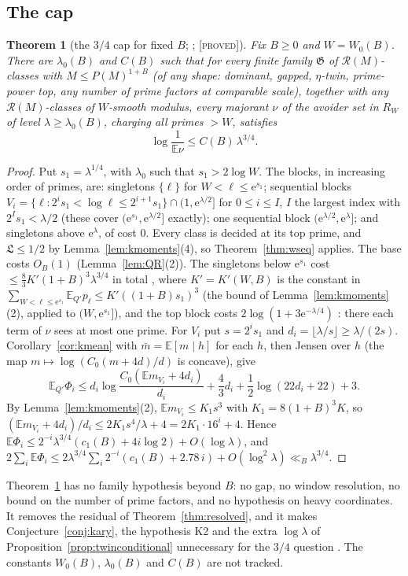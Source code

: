 \documentclass[10pt,reqno]{amsart}
\newtheorem{theorem}{Theorem}[section]
\theoremstyle{definition}
\theoremstyle{remark}
\newcommand{\cR}{\mathscr R}
\newcommand{\cG}{\mathfrak G}
\newcommand{\E}{\mathbb E}
\newcommand{\e}{\mathrm e}
\newcommand{\lab}[1]{\textup{[\textsc{#1}]}}
\begin{document}
\subsection{The cap}
\begin{theorem}[the $3/4$ cap for fixed $B$; {\cite[Thm~4.5]{KA}}; \lab{proved}]\label{thm:karycap}
Fix $B\geq0$ and $W=W_0(B)$.  There are $\lambda_0(B)$ and $C(B)$ such that
for every finite family $\cG$ of $\cR(M)$-classes with $M\leq P(M)^{1+B}$ (of any
shape: dominant, gapped, $\eta$-twin, prime-power top, any number of prime
factors at comparable scale), together with any $\cR(M)$-classes of
$W$-smooth modulus, every majorant $\nu$ of the avoider set in $R_W$ of
level $\lambda\geq\lambda_0(B)$, charging all primes $>W$, satisfies
\[
 \log\frac1{\E\nu}\leq C(B)\,\lambda^{3/4}.
\]
\end{theorem}
\begin{proof}
Put $s_1=\lambda^{1/4}$, with $\lambda_0$ such that $s_1>2\log W$.  The blocks,
in increasing order of primes, are: singletons $\{\ell\}$ for
$W<\ell\leq\e^{s_1}$; sequential blocks
$V_i=\{\ell:2^is_1<\log\ell\leq2^{i+1}s_1\}\cap(1,\e^{\lambda/2}]$ for
$0\leq i\leq I$, $I$ the largest index with $2^Is_1<\lambda/2$ (these cover
$(\e^{s_1},\e^{\lambda/2}]$ exactly); one sequential block
$(\e^{\lambda/2},\e^\lambda]$; and singletons above $\e^\lambda$, of cost $0$.
Every class is decided at its top prime, and $\mathfrak L\leq1/2$ by
Lemma~\ref{lem:kmoments}(4), so Theorem~\ref{thm:wseq} applies.  The base
costs $O_B(1)$ (Lemma~\ref{lem:QR}(2)).  The singletons below
$\e^{s_1}$ cost $\leq\frac83K'(1+B)^3\lambda^{3/4}$ in total
\cite[Prop.~4.1]{TW}, where $K'=K'(W,B)$ is the constant in
$\sum_{W<\ell\leq\e^{s_1}}\E_{Q'}p_\ell\leq K'((1+B)s_1)^3$ (the bound of
Lemma~\ref{lem:kmoments}(2), applied to $(W,\e^{s_1}]$), and the top block costs $2\log(1+3\e^{-\lambda/4})$
\cite[Lemma~4.2, Cor.~4.3]{TW}: there each term of $\nu$ sees at most one
prime.  For $V_i$ put $s=2^is_1$ and $d_i=\lfloor\lambda/s\rfloor\geq\lambda/(2s)$.
Corollary~\ref{cor:kmean} with $\bar m=\E[m\mid h]$ for each $h$, then
Jensen over $h$ (the map $m\mapsto\log(C_0(m+4d)/d)$ is concave), give
\[
 \E_{Q'}\Phi_i\leq d_i\log\frac{C_0(\E m_{V_i}+4d_i)}{d_i}+\frac43d_i+\frac12\log(22d_i+22)+3.
\]
By Lemma~\ref{lem:kmoments}(2), $\E m_{V_i}\leq K_1s^3$ with
$K_1=8(1+B)^3K$, so $(\E m_{V_i}+4d_i)/d_i\leq2K_1s^4/\lambda+4=2K_1\cdot16^i+4$.
Hence $\E\Phi_i\leq2^{-i}\lambda^{3/4}(c_1(B)+4i\log2)+O(\log\lambda)$, and
$2\sum_i\E\Phi_i\leq2\lambda^{3/4}\sum_i2^{-i}(c_1(B)+2.78\,i)+O(\log^2\lambda)\ll_B\lambda^{3/4}$.
\end{proof}
Theorem~\ref{thm:karycap} has no family hypothesis beyond $B$: no gap,
no window resolution, no bound on the number of prime factors, and no
hypothesis on heavy coordinates.  It removes the residual of
Theorem~\ref{thm:resolved}, and it makes Conjecture~\ref{conj:kary},
the hypothesis K2 and the extra $\log\lambda$ of
Proposition~\ref{prop:twinconditional} unnecessary for the $3/4$
question \cite[\S4.3]{KA}.  The constants $W_0(B)$, $\lambda_0(B)$ and
$C(B)$ are not tracked.
\end{document}
